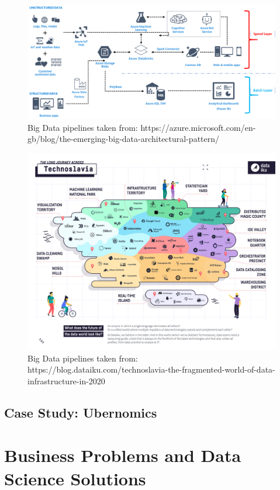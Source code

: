 \documentclass[
]{book}
\begin{document}
\begin{figure}

{\centering \includegraphics[width=0.8\linewidth]{images/azure} 

}

\caption{Big Data pipelines taken from: https://azure.microsoft.com/en-gb/blog/the-emerging-big-data-architectural-pattern/}\label{fig:azure-fig}
\end{figure}

\begin{figure}

{\centering \includegraphics[width=0.8\linewidth]{images/technoslavia} 

}

\caption{Big Data pipelines taken from: https://blog.dataiku.com/technoslavia-the-fragmented-world-of-data-infrastructure-in-2020}\label{fig:technoslavia-fig}
\end{figure}

\hypertarget{case-study-ubernomics}{%
\section{Case Study: Ubernomics}\label{case-study-ubernomics}}

\hypertarget{businessproblems}{%
\chapter{Business Problems and Data Science Solutions}\label{businessproblems}}
\end{document}
